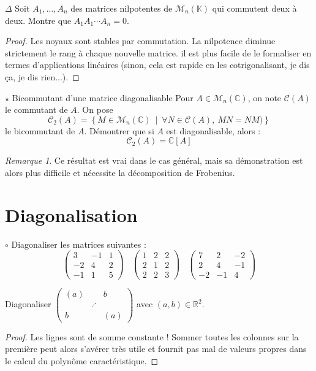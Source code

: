\documentclass[french,a4paper]{article}
\newcommand{\R}{\mathbb{R}}
\newcommand{\C}{\mathbb{C}}
\newcommand{\K}{\mathbb{K}}
\theoremstyle{plain}
\theoremstyle{definition}
\theoremstyle{remark}
\newtheorem*{rmq}{Remarque}
\begin{document}
\begin{ex}{$\Delta$}
	Soit $A_1,\ldots,A_n$ des matrices nilpotentes de $\mathcal{M}_n(\K)$ qui commutent deux à deux. Montre que $A_1A_1\cdots A_n=0$.
\end{ex}
\begin{proof}
	Les noyaux sont stables par commutation. La nilpotence diminue strictement le rang à chaque nouvelle matrice. il est plus facile de le formaliser en termes d'applications linéaires (sinon, cela est rapide en les cotrigonalisant, je dis ça, je dis rien...).
\end{proof}

\begin{ex}[Châteaux]{$\star$ Bicommutant d'une matrice diagonalisable}
	Pour $A\in\mathcal{M}_n(\C)$, on note $\mathcal{C}(A)$ le commutant de $A$. On pose $$\mathcal{C}_2(A)=\left\{M\in\mathcal{M}_n(\C)\ \mid\ \forall N\in\mathcal{C}(A),\ MN=NM)\right\}$$ le bicommutant de $A$. Démontrer que si $A$ est diagonalisable, alors : $$\mathcal{C}_2(A)=\C[A]$$
\end{ex}
\begin{rmq}
	Ce résultat est vrai dans le cas général, mais sa démonstration est alors plus difficile et nécessite la décomposition de Frobenius.
\end{rmq}

\section{Diagonalisation}

\begin{ex}{$\circ$}
	Diagonaliser les matrices suivantes : 
	$$\begin{pmatrix}
		3&-1&1\\
		-2&4&2\\
		-1&1&5
	\end{pmatrix}\ \ \ \
	\begin{pmatrix}
		1&2&2\\
		2&1&2\\
		2&2&3
	\end{pmatrix}\ \ \ \
	\begin{pmatrix}
		7&2&-2\\
		2&4&-1\\
		-2&-1&4
	\end{pmatrix}$$
\end{ex}

\begin{ex}{}
	Diagonaliser $\displaystyle\begin{pmatrix}
		(a)&&b\\
		&\iddots&\\
		b&&(a)
	\end{pmatrix}$ avec $(a,b)\in\R^2$.
\end{ex}
\begin{proof}
	Les lignes sont de somme constante ! Sommer toutes les colonnes sur la première peut alors s'avérer très utile et fournit pas mal de valeurs propres dans le calcul du polynôme caractéristique.
\end{proof}
\end{document}
